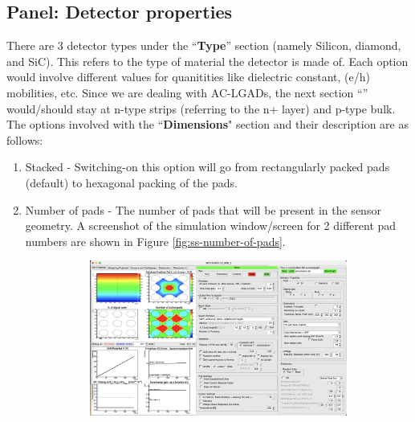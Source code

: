 \documentclass[11pt]{article}
\begin{document}
\subsection{Panel: Detector properties}
There are 3 detector types under the ``\textbf{Type}'' section (namely Silicon, diamond, and SiC). This refers to the type of material the detector is made of. Each option would involve different values for quanitities like dielectric constant, (e/h) mobilities, etc.
\newline
Since we are dealing with AC-LGADs, the next section ``\textbf{}'' would/should stay at n-type strips (referring to the n+ layer) and p-type bulk.
\newline
The options involved with the ``\textbf{Dimensions}" section and their description are as follows:
\begin{enumerate}
    \item Stacked - Switching-on this option will go from rectangularly packed pads (default) to hexagonal packing of the pads.
    \item Number of pads - The number of pads that will be present in the sensor geometry. A screenshot of the simulation window/screen for 2 different pad numbers are shown in Figure \ref{fig:ss-number-of-pads}.
    \begin{figure}[h!]
        \centering
        \begin{subfigure}[t]{0.99\textwidth}
            \centering
            \includegraphics[width=5in]{Images/3x3_pad_structure.png}
            \caption{}
            \label{fig:3x3-pad-field}
        \end{subfigure}%


\end{figure}
\end{enumerate}
\end{document}
